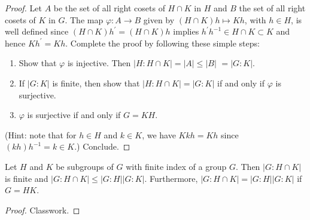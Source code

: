 \documentclass[11pt,a4paper]{article}
\begin{document}
\begin{proof}
    Let $A$ be the set of all right cosets of $H \cap K$ in $H$ and $B$ the set of all right cosets of $K$ in $G$.
    The map $\varphi: A \rightarrow B$ given by $(H \cap K) h \mapsto K h$, with $h \in H$, is well defined since $(H \cap K) h^{\prime}=(H \cap K) h$ implies $h^{\prime} h^{-1} \in H \cap K \subset K$ and hence $K h^{\prime}=K h$.
    Complete the proof by following these simple steps:
    \begin{enumerate}[label=(\roman*)]
        \item Show that $\varphi$ is injective. Then $|H: H \cap K|=|A| \leq|B|$ $=|G: K|$.
        \item If $|G: K|$ is finite, then show that $|H: H \cap K|=|G: K|$ if and only if $\varphi$ is surjective.
        \item $\varphi$ is surjective if and only if $G=K H$.
    \end{enumerate}
    
    (Hint: note that for $h \in H$ and $k \in K$, we have $ K k h=K h$ since $(k h) h^{-1}=k \in K$.) Conclude.
\end{proof}


\begin{prop}
    Let \( H \) and \( K \) be subgroups of \( G \) with finite index of a group \( G \). Then \( |G : H \cap K| \) is finite and \(|G : H \cap K| \leq |G : H| |G : K| \). Furthermore, \(|G : H \cap K| = |G : H| |G : K| \) if \( G = HK \).
\end{prop}

\begin{proof}
    Classwork.
\end{proof}
\end{document}
